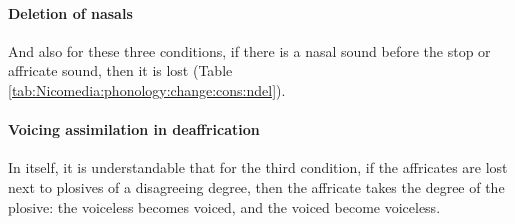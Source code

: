 \paragraph{Deletion of nasals}

And also for these three conditions, if there is a nasal sound before the stop or affricate sound, then it is lost (Table \ref{tab:Nicomedia:phonology:change:cons:ndel}). 

\begin{table}[H]
	\centering 
	\caption{Deletion of nasals in cluster reduction in the Nicomedia dialect}
	\label{tab:Nicomedia:phonology:change:cons:ndel}
\end{table}


\paragraph{Voicing assimilation in deaffrication}


In itself, it is understandable that for the third condition, if the affricates are lost next to plosives of a disagreeing degree, then the affricate takes the degree of the plosive: the voiceless becomes voiced, and the voiced become voiceless. 


